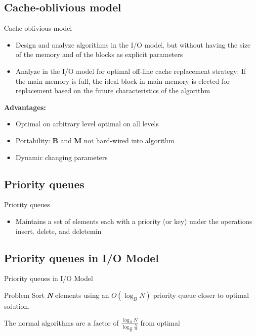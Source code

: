 \documentclass{beamer}
\begin{document}
\begin{darkframes}
    \subsection{Cache-oblivious model}
    \begin{frame}{Cache-oblivious model}
        \begin{itemize}
            \item Design and analyze algorithms in the I/O model, but without having the size of the memory and of the blocks as explicit parameters
            \item Analyze in the I/O model for optimal off-line cache replacement strategy: If the main memory is full, the ideal block in main memory is elected for replacement based on the future characteristics of the algorithm
        \end{itemize}
        \bigskip
        \textbf{Advantages:}
        \begin{itemize}
            \item Optimal on arbitrary level optimal on all levels
            \item Portability: \textbf{B} and \textbf{M} not hard-wired into algorithm
            \item Dynamic changing parameters
        \end{itemize}
    \end{frame}

	\subsection{Priority queues}
    \begin{frame}{Priority queues}
        \begin{itemize}
            \item Maintains a set of elements each with a priority (or key) under the operations insert, delete, and deletemin
        \end{itemize}
    \end{frame}
    
	\subsection{Priority queues in I/O Model}
    \begin{frame}{Priority queues in I/O Model}
        \begin{block}{Problem}
        Sort \textbf{\textit{N}} elements using an \(O(\log_B N)\) priority queue closer to optimal solution.
      \end{block}
      \bigskip
      The normal algorithms are a factor of \(\frac{\log_B N}{\log_\frac{M}{B} \frac{N}{B}}\) from optimal
    \end{frame}
    

\end{darkframes}
\end{document}
